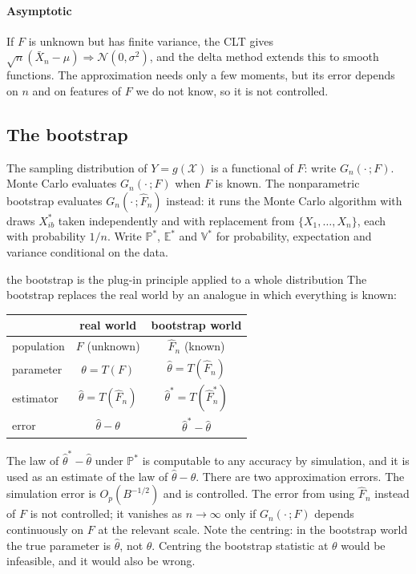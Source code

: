 \documentclass[11pt,a4paper]{article}
\newcommand{\E}{\mathbb{E}}
\newcommand{\V}{\mathbb{V}}
\renewcommand{\P}{\mathbb{P}}
\newcommand{\N}{\mathcal{N}}
\newcommand{\cd}{\Rightarrow}
\newcommand{\Op}{O_p}
\newcommand{\Xbar}{\bar X_n}
\newcommand{\Fn}{\widehat F_n}
\newcommand{\Pstar}{\P^{*}}
\newcommand{\Estar}{\E^{*}}
\newcommand{\Vstar}{\V^{*}}
\begin{document}
\paragraph{Asymptotic}
If $F$ is unknown but has finite variance, the CLT gives $\sqrt n(\Xbar-\mu)\cd\N(0,\sigma^2)$, and the delta method extends this to smooth functions. The approximation needs only a few moments, but its error depends on $n$ and on features of $F$ we do not know, so it is not controlled.

\subsection{The bootstrap}\label{sec:boot}

The sampling distribution of $Y=g(\mathcal X)$ is a functional of $F$: write $G_n(\cdot\,;F)$. Monte Carlo evaluates $G_n(\cdot\,;F)$ when $F$ is known. The nonparametric bootstrap evaluates $G_n(\cdot\,;\Fn)$ instead: it runs the Monte Carlo algorithm with draws $X_{ib}^*$ taken independently and with replacement from $\{X_1,\ldots,X_n\}$, each with probability $1/n$. Write $\Pstar$, $\Estar$ and $\Vstar$ for probability, expectation and variance conditional on the data.

\begin{whybox}{the bootstrap is the plug-in principle applied to a whole distribution}
The bootstrap replaces the real world by an analogue in which everything is known:
\begin{center}
\small
\begin{tabular}{@{}lcc@{}}
\toprule
& real world & bootstrap world\\
\midrule
population & $F$ (unknown) & $\Fn$ (known)\\
parameter & $\theta=T(F)$ & $\hat\theta=T(\Fn)$\\
estimator & $\hat\theta=T(\Fn)$ & $\hat\theta^*=T(\Fn^*)$\\
error & $\hat\theta-\theta$ & $\hat\theta^*-\hat\theta$\\
\bottomrule
\end{tabular}
\end{center}
The law of $\hat\theta^*-\hat\theta$ under $\Pstar$ is computable to any accuracy by simulation, and it is used as an estimate of the law of $\hat\theta-\theta$. There are two approximation errors. The simulation error is $\Op(B^{-1/2})$ and is controlled. The error from using $\Fn$ instead of $F$ is not controlled; it vanishes as $n\to\infty$ only if $G_n(\cdot\,;F)$ depends continuously on $F$ at the relevant scale. Note the centring: in the bootstrap world the true parameter is $\hat\theta$, not $\theta$. Centring the bootstrap statistic at $\theta$ would be infeasible, and it would also be wrong.
\end{whybox}
\end{document}

